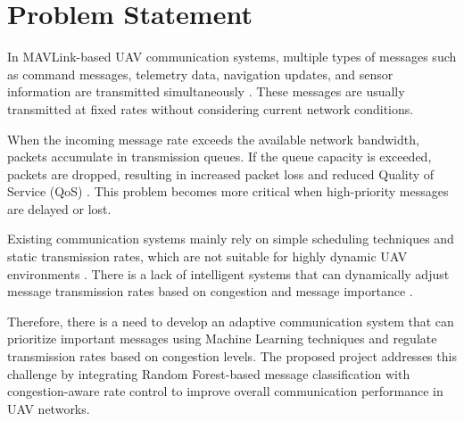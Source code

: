 \section{Problem Statement}

In MAVLink-based UAV communication systems, multiple types of 
messages such as command messages, telemetry data, navigation 
updates, and sensor information are transmitted simultaneously 
\cite{koubaa2019micro}. These messages are usually transmitted 
at fixed rates without considering current network conditions.

When the incoming message rate exceeds the available network 
bandwidth, packets accumulate in transmission queues. If the 
queue capacity is exceeded, packets are dropped, resulting in 
increased packet loss and reduced Quality of Service (QoS) 
\cite{anwekar2023analysis}. This problem becomes more critical 
when high-priority messages are delayed or lost.

Existing communication systems mainly rely on simple scheduling 
techniques and static transmission rates, which are not suitable 
for highly dynamic UAV environments \cite{li2018prioritizing,
halder2022dynamic}. There is a lack of intelligent systems that 
can dynamically adjust message transmission rates based on 
congestion and message importance \cite{verma2024adaptive}.

Therefore, there is a need to develop an adaptive communication 
system that can prioritize important messages using Machine 
Learning techniques and regulate transmission rates based on 
congestion levels. The proposed project addresses this challenge 
by integrating Random Forest-based message classification with 
congestion-aware rate control to improve overall communication 
performance in UAV networks.
